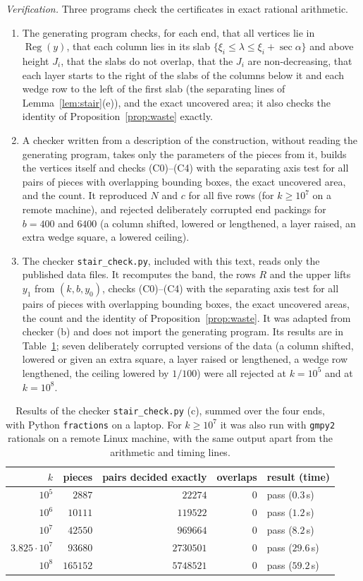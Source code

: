 \documentclass[11pt]{amsart}
\newcommand{\Reg}{\operatorname{Reg}}
\newcommand{\se}{\sec\alpha}
\theoremstyle{definition}
\theoremstyle{remark}
\numberwithin{equation}{section}
\begin{document}
\emph{Verification.} Three programs check the certificates in exact rational arithmetic.
\begin{enumerate}[label=(\alph*)]
\item The generating program checks, for each end, that all vertices lie in $\Reg(y)$, that each column lies in its
slab $\{\xi_i\le\lambda\le\xi_i+\se\}$ and above height $J_i$, that the slabs do not overlap, that the $J_i$ are
non-decreasing, that each layer starts to the right of the slabs of the columns below it and each wedge row to the left
of the first slab (the separating lines of Lemma~\ref{lem:stair}(e)), and the exact uncovered area; it also checks the
identity of Proposition~\ref{prop:waste} exactly.
\item A checker written from a description of the construction, without reading the generating program, takes only the
parameters of the pieces from it, builds the vertices itself and checks (C0)--(C4) with the separating axis test for
all pairs of pieces with overlapping bounding boxes, the exact uncovered area, and the count. It reproduced $N$ and $c$
for all five rows (for $k\ge10^7$ on a remote machine), and rejected deliberately corrupted end packings for
$b=400$ and $6400$ (a column shifted, lowered or lengthened, a layer raised, an extra wedge square, a lowered
ceiling).
\item The checker \texttt{stair\_check.py}, included with this text, reads only the published data files.
It recomputes the band, the rows $R$ and the upper lifts $y_1$ from $(k,b,y_0)$, checks (C0)--(C4)
with the separating axis test for all pairs of pieces with overlapping bounding boxes, the exact uncovered areas, the
count and the identity of Proposition~\ref{prop:waste}. It was adapted from checker (b) and does not import the
generating program. Its results are in Table~\ref{tab:verif}; seven deliberately corrupted versions of the data (a
column shifted, lowered or given an extra square, a layer raised or lengthened, a wedge row lengthened, the ceiling
lowered by $1/100$) were all rejected at $k=10^5$ and at $k=10^8$.
\end{enumerate}
\begin{table}[ht]
\centering
\small
\begin{tabular}{rrrrl}
\toprule
$k$ & pieces & pairs decided exactly & overlaps & result (time)\\
\midrule
$10^5$ & $2887$ & $22274$ & $0$ & pass ($0.3$\,s)\\
$10^6$ & $10111$ & $119522$ & $0$ & pass ($1.2$\,s)\\
$10^7$ & $42550$ & $969664$ & $0$ & pass ($8.2$\,s)\\
$3.825\cdot10^7$ & $93680$ & $2730501$ & $0$ & pass ($29.6$\,s)\\
$10^8$ & $165152$ & $5748521$ & $0$ & pass ($59.2$\,s)\\
\bottomrule
\end{tabular}
\medskip
\caption{Results of the checker \texttt{stair\_check.py} (c), summed over the four ends, with Python
\texttt{fractions} on a laptop. For $k\ge10^7$ it was also run with \texttt{gmpy2} rationals on a remote Linux
machine, with the same output apart from the arithmetic and timing lines.}\label{tab:verif}
\end{table}
\end{document}
